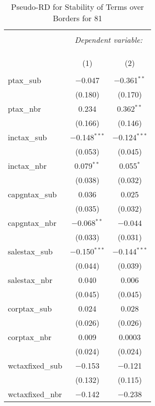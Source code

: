 
\begin{table}[!htbp] \centering 
  \caption{Pseudo-RD for Stability of Terms over Borders for  81} 
  \label{} 
\begin{tabular}{@{\extracolsep{5pt}}lcc} 
\\[-1.8ex]\hline 
\hline \\[-1.8ex] 
 & \multicolumn{2}{c}{\textit{Dependent variable:}} \\ 
\cline{2-3} 
\\[-1.8ex] & \multicolumn{2}{c}{ } \\ 
\\[-1.8ex] & (1) & (2)\\ 
\hline \\[-1.8ex] 
 ptax\_sub & $-$0.047 & $-$0.361$^{**}$ \\ 
  & (0.180) & (0.170) \\ 
  ptax\_nbr & 0.234 & 0.362$^{**}$ \\ 
  & (0.166) & (0.146) \\ 
  inctax\_sub & $-$0.148$^{***}$ & $-$0.124$^{***}$ \\ 
  & (0.053) & (0.045) \\ 
  inctax\_nbr & 0.079$^{**}$ & 0.055$^{*}$ \\ 
  & (0.038) & (0.032) \\ 
  capgntax\_sub & 0.036 & 0.025 \\ 
  & (0.035) & (0.032) \\ 
  capgntax\_nbr & $-$0.068$^{**}$ & $-$0.044 \\ 
  & (0.033) & (0.031) \\ 
  salestax\_sub & $-$0.150$^{***}$ & $-$0.144$^{***}$ \\ 
  & (0.044) & (0.039) \\ 
  salestax\_nbr & 0.040 & 0.006 \\ 
  & (0.045) & (0.045) \\ 
  corptax\_sub & 0.024 & 0.028 \\ 
  & (0.026) & (0.026) \\ 
  corptax\_nbr & 0.009 & 0.0003 \\ 
  & (0.024) & (0.024) \\ 
  wctaxfixed\_sub & $-$0.153 & $-$0.121 \\ 
  & (0.132) & (0.115) \\ 
  wctaxfixed\_nbr & $-$0.142 & $-$0.238 \\ 

\end{tabular}
\end{table}
